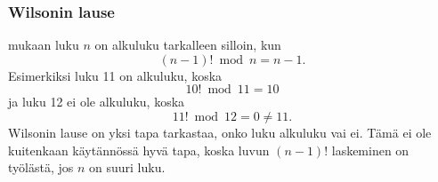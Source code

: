 \subsubsection{Wilsonin lause}


 mukaan luku $n$ on alkuluku
tarkalleen silloin, kun
\[(n-1)! \bmod n = n-1.\]
Esimerkiksi luku 11 on alkuluku, koska
\[10! \bmod 11 = 10\]
ja luku 12 ei ole alkuluku, koska
\[11! \bmod 12 = 0 \neq 11.\]
Wilsonin lause on yksi tapa tarkastaa, onko luku alkuluku vai ei.
Tämä ei ole kuitenkaan käytännössä hyvä tapa,
koska luvun $(n-1)!$ laskeminen on työlästä,
jos $n$ on suuri luku.
